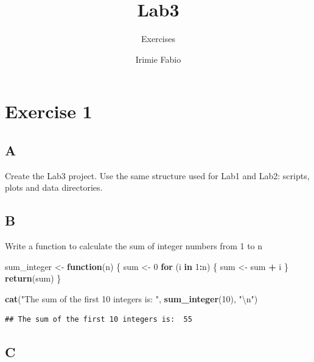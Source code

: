 \documentclass[
]{article}
\title{Lab3}
\subtitle{Exercises}
\author{Irimie Fabio}
\date{}
\newenvironment{Shaded}{\begin{snugshade}}{\end{snugshade}}
\newcommand{\CharTok}[1]{\textcolor[rgb]{0.31,0.60,0.02}{#1}}
\newcommand{\ControlFlowTok}[1]{\textcolor[rgb]{0.13,0.29,0.53}{\textbf{#1}}}
\newcommand{\DecValTok}[1]{\textcolor[rgb]{0.00,0.00,0.81}{#1}}
\newcommand{\KeywordTok}[1]{\textcolor[rgb]{0.13,0.29,0.53}{\textbf{#1}}}
\newcommand{\NormalTok}[1]{#1}
\newcommand{\OperatorTok}[1]{\textcolor[rgb]{0.81,0.36,0.00}{\textbf{#1}}}
\newcommand{\StringTok}[1]{\textcolor[rgb]{0.31,0.60,0.02}{#1}}
\begin{document}
\maketitle

{
\setcounter{tocdepth}{2}
\tableofcontents
}
\hypertarget{exercise-1}{%
\section{Exercise 1}\label{exercise-1}}

\hypertarget{a}{%
\subsection{A}\label{a}}

Create the Lab3 project. Use the same structure used for Lab1 and Lab2:
scripts, plots and data directories.

\hypertarget{b}{%
\subsection{B}\label{b}}

Write a function to calculate the sum of integer numbers from 1 to n

\begin{Shaded}
\begin{Highlighting}[]
\NormalTok{sum\_integer \textless{}{-}}\StringTok{ }\ControlFlowTok{function}\NormalTok{(n) \{}
\NormalTok{  sum \textless{}{-}}\StringTok{ }\DecValTok{0}
  \ControlFlowTok{for}\NormalTok{ (i }\ControlFlowTok{in} \DecValTok{1}\OperatorTok{:}\NormalTok{n) \{}
\NormalTok{    sum \textless{}{-}}\StringTok{ }\NormalTok{sum }\OperatorTok{+}\StringTok{ }\NormalTok{i}
\NormalTok{  \}}
  \KeywordTok{return}\NormalTok{(sum)}
\NormalTok{\}}

\KeywordTok{cat}\NormalTok{(}\StringTok{"The sum of the first 10 integers is: "}\NormalTok{, }\KeywordTok{sum\_integer}\NormalTok{(}\DecValTok{10}\NormalTok{), }\StringTok{"}\CharTok{\textbackslash{}n}\StringTok{"}\NormalTok{)}
\end{Highlighting}
\end{Shaded}

\begin{verbatim}
## The sum of the first 10 integers is:  55
\end{verbatim}

\hypertarget{c}{%
\subsection{C}\label{c}}
\end{document}
